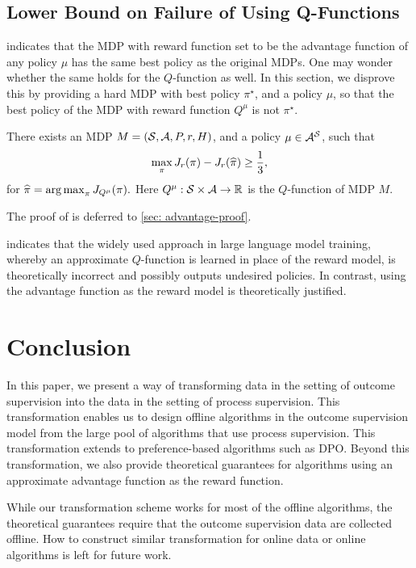 \documentclass{article}
\begin{document}
\subsection{Lower Bound on Failure of Using Q-Functions}
 indicates that the MDP with reward function set to be the advantage function of any policy $\mu$ has the same best policy as the original MDPs. One may wonder whether the same holds for the $Q$-function as well. In this section, we disprove this by providing a hard MDP with best policy $\pi^\star$, and a policy $\mu$, so that the best policy of the MDP with reward function $Q^\mu$ is not $\pi^\star$.
\begin{theorem}\label{thm: hard-case}
    There exists an MDP $M = (\mathcal{S}, \mathcal{A}, P, r, H)$, and a policy $\mu\in \mathcal{A}^{\mathcal{S}}$, such that 
    $$\max_{\pi}J_{r}(\pi) - J_{r}(\widehat{\pi})\ge \frac{1}{3},$$
    for
    $\widehat{\pi} = \mathop{\arg\max}_{\pi} J_{Q^\mu}(\pi).$
    Here $Q^\mu: \mathcal{S}\times\mathcal{A}\to \mathbb{R}$ is the $Q$-function of MDP $M$.
\end{theorem}
The proof of  is deferred to \cref{sec: advantage-proof}. 

 indicates that the widely used approach in large language model training, whereby an approximate $Q$-function is learned in place of the reward model, is theoretically incorrect and possibly outputs undesired policies. In contrast, using the advantage function as the reward model is theoretically justified.





\section{Conclusion}
In this paper, we present a way of transforming data in the setting of outcome supervision into the data in the setting of process supervision. This transformation enables us to design offline algorithms in the outcome supervision model from the large pool of algorithms that use process supervision. This transformation extends to preference-based algorithms such as DPO. Beyond this transformation, we also provide theoretical guarantees for algorithms using an approximate advantage function as the reward function.

While our transformation scheme works for most of the offline algorithms, the theoretical guarantees require that the outcome supervision data are collected offline. How to construct similar transformation for online data or online algorithms is left for future work.
\end{document}

